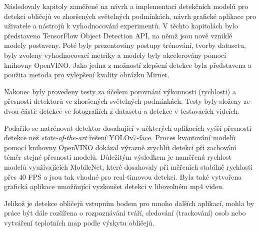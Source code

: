 Následovaly kapitoly zaměřené na návrh a implementaci detekčních modelů pro detekci obličejů ve zhoršených světelných podmínkách, návrh grafické aplikace pro uživatele a nástrojů k vyhodnocování experimentů. V těchto kapitolách bylo představeno TensorFlow Object Detection API, na němž jsou nově vzniklé modely postaveny. Poté byly prezentovány postupy trénování, tvorby datasetu, byly zvoleny vyhodnocovací metriky a modely byly akcelerovány pomocí knihovny OpenVINO. Jako jedna z možností zlepšení detekce byla představena a použita metoda pro vylepšení kvality obrázku Mirnet.

Nakonec byly provedeny testy za účelem porovnání výkonnosti (rychlosti) a přesnosti detektorů ve zhoršených světelných podmínkách. Testy byly složeny ze dvou částí: detekce ve fotografiích z datasetu a detekce v testovacích videích.

Podařilo se natrénovat detektor dosahující v některých aplikacích vyšší přesnosti detekce než \emph{state-of-the-art} řešení YOLOv7-face. Proces kvantování modelů pomocí knihovny OpenVINO dokázal výrazně zrychlit detekci při zachování téměr stejné přesnosti modelů.
Důležitým výsledkem je naměřená rychlost modelů využívajících MobileNet, které dosahovaly při měřeních stabilně rychlosti přes 40 FPS a jsou tak vhodné pro real-timovou detekci.
Byla také vytvořena grafická aplikace umožňující vyzkoušet detekci v libovolném mp4 videu. 

Jelikož je detekce obličejů vstupním bodem pro mnoho dalších aplikací, mohla by práce být dále rozšířena o rozpoznávání tváří, sledování (trackování) osob nebo vytváření teplotních map podle výskytu obličejů.